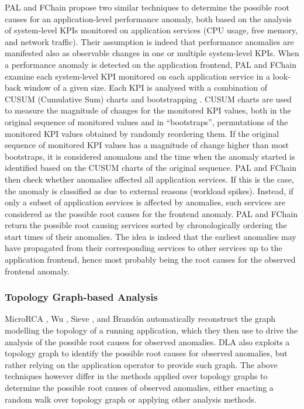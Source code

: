 PAL \cite{42_Nguyen2011_PAL} and FChain \cite{43_Nguyen2013_FChain} propose two similar techniques to determine the possible root causes for an application-level performance anomaly, both based on the analysis of system-level KPIs monitored on application services (\viz CPU usage, free memory, and network traffic).
Their assumption is indeed that performance anomalies are manifested also as observable changes in one or multiple system-level KPIs.
When a performance anomaly is detected on the application frontend, PAL \cite{42_Nguyen2011_PAL} and FChain \cite{43_Nguyen2013_FChain} examine each system-level KPI monitored on each application service in a look-back window of a given size. 
Each KPI is analysed with a combination of CUSUM (Cumulative Sum) charts and bootstrapping \cite{Basseville1993_DetectionAbruptChanges}.
CUSUM charts are used to measure the magnitude of changes for the monitored KPI values, both in the original sequence of monitored values and in \enquote{bootstraps}, \viz permutations of the monitored KPI values obtained by randomly reordering them. 
If the original sequence of monitored KPI values has a magnitude of change higher than most bootstraps, it is considered anomalous and the time when the anomaly started is identified based on the CUSUM charts of the original sequence.
PAL \cite{42_Nguyen2011_PAL} and FChain \cite{43_Nguyen2013_FChain} then check whether anomalies affected all application services. 
If this is the case, the anomaly is classified as due to external reasons (\eg workload spikes). 
Instead, if only a subset of application services is affected by anomalies, such services are considered as the possible root causes for the frontend anomaly.
PAL \cite{42_Nguyen2011_PAL} and FChain \cite{43_Nguyen2013_FChain} return the possible root causing services sorted by chronologically ordering the start times of their anomalies.
The idea is indeed that the earliest anomalies may have propagated from their corresponding services to other services up to the application frontend, hence most probably being the root causes for the observed frontend anomaly.

\subsubsection{{Topology Graph-based Analysis}}
MicroRCA \cite{04_Wu2020_MicroRCA}, Wu \etal \cite{09_Wu2020_MicroserviceDiagnosisDeepLearning}, Sieve \cite{30_Thalheim2017_Sieve}, and Brand\'on \etal \cite{11_Brandon2020_GraphBasedRootCauseAnalysis} automatically reconstruct the graph modelling the topology of a running application, which they then use to drive the analysis of the possible root causes for observed anomalies.
{%
DLA \cite{14_Samir2019_DLA} also exploits a topology graph to identify the possible root causes for observed anomalies, but rather relying on the application operator to provide such graph.
The above techniques however differ in the methods applied over topology graphs to determine the possible root causes of observed anomalies, either enacting a random walk over topology graph or applying other analysis methods. 
}

